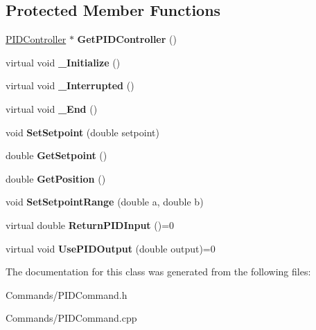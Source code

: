\subsection*{Protected Member Functions}
\begin{DoxyCompactItemize}
\item 
\hypertarget{classPIDCommand_ac00fd41bf3d9a190f05aea9a668306ca}{
\hyperlink{classPIDController}{PIDController} $\ast$ {\bfseries GetPIDController} ()}
\label{classPIDCommand_ac00fd41bf3d9a190f05aea9a668306ca}

\item 
\hypertarget{classPIDCommand_a80cefbe5802ad9f939932075ecf9aea6}{
virtual void {\bfseries \_\-Initialize} ()}
\label{classPIDCommand_a80cefbe5802ad9f939932075ecf9aea6}

\item 
\hypertarget{classPIDCommand_ac1c216bd406a5ec5a38157072067c15b}{
virtual void {\bfseries \_\-Interrupted} ()}
\label{classPIDCommand_ac1c216bd406a5ec5a38157072067c15b}

\item 
\hypertarget{classPIDCommand_a00c14fa58eb555ca6b566b83c5108d35}{
virtual void {\bfseries \_\-End} ()}
\label{classPIDCommand_a00c14fa58eb555ca6b566b83c5108d35}

\item 
\hypertarget{classPIDCommand_a2273f901bc79b081dadfe18f629ea4e5}{
void {\bfseries SetSetpoint} (double setpoint)}
\label{classPIDCommand_a2273f901bc79b081dadfe18f629ea4e5}

\item 
\hypertarget{classPIDCommand_adadad2058b4449eb812dd1056454e866}{
double {\bfseries GetSetpoint} ()}
\label{classPIDCommand_adadad2058b4449eb812dd1056454e866}

\item 
\hypertarget{classPIDCommand_a246177822d70068c8675b4ae7ccd8d66}{
double {\bfseries GetPosition} ()}
\label{classPIDCommand_a246177822d70068c8675b4ae7ccd8d66}

\item 
\hypertarget{classPIDCommand_a6cb74d9a50b3da9258a2d6fdd2696e56}{
void {\bfseries SetSetpointRange} (double a, double b)}
\label{classPIDCommand_a6cb74d9a50b3da9258a2d6fdd2696e56}

\item 
\hypertarget{classPIDCommand_ab7ed9a7dc35984f9d0382c0b53a043e3}{
virtual double {\bfseries ReturnPIDInput} ()=0}
\label{classPIDCommand_ab7ed9a7dc35984f9d0382c0b53a043e3}

\item 
\hypertarget{classPIDCommand_acff5c0d103980c440aa72415002287ac}{
virtual void {\bfseries UsePIDOutput} (double output)=0}
\label{classPIDCommand_acff5c0d103980c440aa72415002287ac}

\end{DoxyCompactItemize}


The documentation for this class was generated from the following files:\begin{DoxyCompactItemize}
\item 
Commands/PIDCommand.h\item 
Commands/PIDCommand.cpp\end{DoxyCompactItemize}

